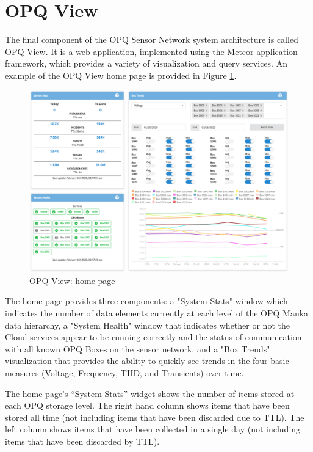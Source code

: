\section{OPQ View}
\label{sec:opq-view}

The final component of the OPQ Sensor Network system architecture is called OPQ View. It is a web application, implemented using the Meteor application framework, which provides a variety of visualization and query services.  An example of the OPQ View home page is provided in Figure \ref{fig:opq-view-home}.

\begin{figure}
\center \includegraphics[width=5in]{images/view/homepage.png}
\caption{OPQ View: home page}
\label{fig:opq-view-home}
\end{figure}

The home page provides three components:  a "System Stats" window which indicates the number of data elements currently at each level of the OPQ Mauka data hierarchy, a "System Health" window that indicates whether or not the Cloud services appear to be running correctly and the status of communication with all known OPQ Boxes on the sensor network, and a "Box Trends" visualization that provides the ability to quickly see trends in the four basic measures (Voltage, Frequency, THD, and Transients) over time.

The home page's ``System Stats'' widget shows the number of items stored at each OPQ storage level. The right hand column shows items that have been stored all time (not including items that have been discarded due to TTL). The left column shows items that have been collected in a single day (not including items that have been discarded by TTL).


